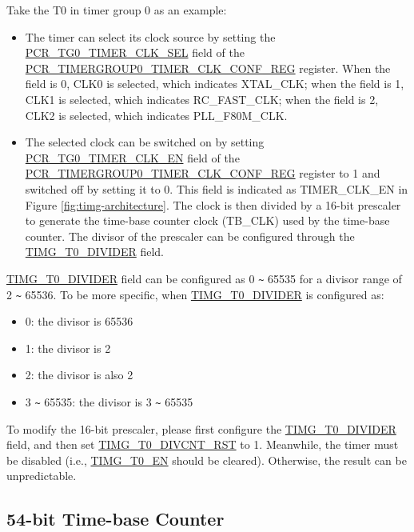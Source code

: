 \documentclass[main\_\_EN.tex]{subfiles}
\begin{document}
Take the T0 in timer group 0 as an example:

\begin{itemize}
    \item The timer can select its clock source by setting the \hyperref[fielddesc:PCRTG0TIMERCLKSEL]{PCR\_TG0\_TIMER\_CLK\_SEL} field of the \hyperref[regdesc:PCRTIMERGROUP0TIMERCLKCONFREG]{PCR\_TIMERGROUP0\_TIMER\_CLK\_CONF\_REG} register. When the field is 0, CLK0 is selected, which indicates XTAL\_CLK; when the field is 1, CLK1 is selected, which indicates RC\_FAST\_CLK; when the field is 2, CLK2 is selected, which indicates PLL\_F80M\_CLK.
    \item The selected clock can be switched on by setting \hyperref[fielddesc:PCRTG0TIMERCLKEN]{PCR\_TG0\_TIMER\_CLK\_EN} field of the \hyperref[regdesc:PCRTIMERGROUP0TIMERCLKCONFREG]{PCR\_TIMERGROUP0\_TIMER\_CLK\_CONF\_REG} register to 1 and switched off by setting it to 0. This field is indicated as TIMER\_CLK\_EN in Figure \ref{fig:timg-architecture}. The clock is then divided by a 16-bit prescaler to generate the time-base counter clock (TB\_CLK) used by the time-base counter. The divisor of the prescaler can be configured through the \hyperref[fielddesc:TIMGTXDIVIDER]{TIMG\_T0\_DIVIDER} field.
\end{itemize}

\hyperref[fielddesc:TIMGTXDIVIDER]{TIMG\_T0\_DIVIDER} field can be configured as 0 \verb+~+ 65535 for a divisor range of 2 \verb+~+ 65536. To be more specific, when \hyperref[fielddesc:TIMGTXDIVIDER]{TIMG\_T0\_DIVIDER} is configured as:

\begin{itemize}
    \item 0: the divisor is 65536
    \item 1: the divisor is 2
    \item 2: the divisor is also 2
    \item 3 \verb+~+ 65535: the divisor is 3 \verb+~+ 65535
\end{itemize}

To modify the 16-bit prescaler, please first configure the \hyperref[fielddesc:TIMGTXDIVIDER]{TIMG\_T0\_DIVIDER} field, and then set \hyperref[fielddesc:TIMGTXDIVCNTRST]{TIMG\_T0\_DIVCNT\_RST} to 1. Meanwhile, the timer must be disabled (i.e., \hyperref[fielddesc:TIMGTXEN]{TIMG\_T0\_EN} should be cleared). Otherwise, the result can be unpredictable.

\subsection{54-bit Time-base Counter}
\end{document}
